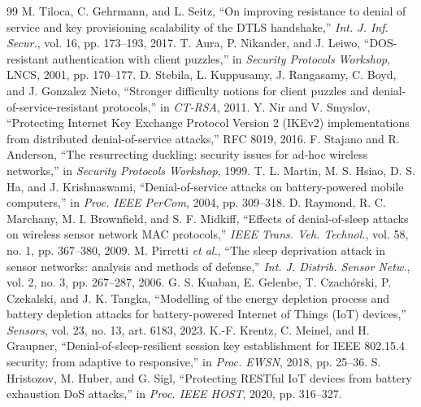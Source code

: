\documentclass[conference]{IEEEtran}
\begin{document}
\begin{thebibliography}{99}
 M. Tiloca, C. Gehrmann, and L. Seitz, ``On improving resistance to denial of service and key
provisioning scalability of the DTLS handshake,'' \emph{Int. J. Inf. Secur.}, vol. 16, pp. 173--193, 2017.
 T. Aura, P. Nikander, and J. Leiwo, ``DOS-resistant authentication with client puzzles,'' in
\emph{Security Protocols Workshop}, LNCS, 2001, pp. 170--177.
 D. Stebila, L. Kuppusamy, J. Rangasamy, C. Boyd, and J. Gonzalez Nieto, ``Stronger difficulty
notions for client puzzles and denial-of-service-resistant protocols,'' in \emph{CT-RSA}, 2011.
 Y. Nir and V. Smyslov, ``Protecting Internet Key Exchange Protocol Version 2 (IKEv2) implementations
from distributed denial-of-service attacks,'' RFC 8019, 2016.
 F. Stajano and R. Anderson, ``The resurrecting duckling: security issues for ad-hoc wireless
networks,'' in \emph{Security Protocols Workshop}, 1999.
 T. L. Martin, M. S. Hsiao, D. S. Ha, and J. Krishnaswami, ``Denial-of-service attacks on
battery-powered mobile computers,'' in \emph{Proc. IEEE PerCom}, 2004, pp. 309--318.
 D. Raymond, R. C. Marchany, M. I. Brownfield, and S. F. Midkiff, ``Effects of denial-of-sleep
attacks on wireless sensor network MAC protocols,'' \emph{IEEE Trans. Veh. Technol.}, vol. 58, no. 1, pp. 367--380,
2009.
 M. Pirretti \emph{et al.}, ``The sleep deprivation attack in sensor networks: analysis and methods
of defense,'' \emph{Int. J. Distrib. Sensor Netw.}, vol. 2, no. 3, pp. 267--287, 2006.
 G. S. Kuaban, E. Gelenbe, T. Czach\'orski, P. Czekalski, and J. K. Tangka, ``Modelling of the energy
depletion process and battery depletion attacks for battery-powered Internet of Things (IoT) devices,''
\emph{Sensors}, vol. 23, no. 13, art. 6183, 2023.
 K.-F. Krentz, C. Meinel, and H. Graupner, ``Denial-of-sleep-resilient session key establishment for
IEEE 802.15.4 security: from adaptive to responsive,'' in \emph{Proc. EWSN}, 2018, pp. 25--36.
 S. Hristozov, M. Huber, and G. Sigl, ``Protecting RESTful IoT devices from battery exhaustion DoS
attacks,'' in \emph{Proc. IEEE HOST}, 2020, pp. 316--327.
\end{thebibliography}
\end{document}
